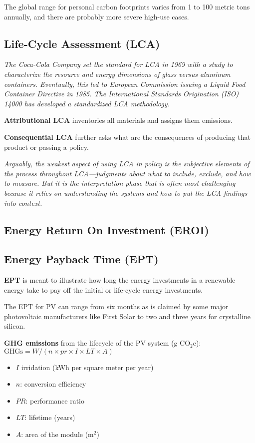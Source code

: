 The global range for personal carbon footprints varies from 1 to 100 metric
tons annually, and there are probably more severe high-use cases.

\subsection{Life-Cycle Assessment (LCA)}

\textit{
The Coca-Cola Company
set the standard for LCA in 1969 with a study to characterize the resource and
energy dimensions of glass versus aluminum containers. Eventually, this led to
European Commission issuing a Liquid Food Container Directive in 1985. The
International Standards Origination (ISO) 14000 has developed a standardized
LCA methodology.
}

\textbf{Attributional LCA} inventories all materials and assigns them
emissions.

\textbf{Consequential LCA} further asks what are the consequences of producing
that product or passing a policy.

\textit{
Arguably, the weakest aspect of using LCA in policy is the subjective elements
of the process throughout LCA—judgments about what to include, exclude, and
how to measure. But it is the interpretation phase that is often most
challenging because it relies on understanding the systems and how to put the
LCA findings into context.
}

\subsection{Energy Return On Investment (EROI)}

\subsection{Energy Payback Time (EPT)}

\textbf{EPT} is meant to illustrate how long the energy investments in a
renewable energy take to pay off the initial or life-cycle energy
investments.

The EPT for PV can range from six months as is claimed by some major
photovoltaic manufacturers like First Solar to two and three years for
crystalline silicon.

\textbf{GHG emissions} from the lifecycle of the PV system (g CO$_2$e):
$\text{GHGs} = W/(n \times pr \times I \times LT \times A)$
\begin{itemize}
	\item $I$ irridation (kWh per square meter per year)
	\item $n$: conversion efficiency
	\item $PR$: performance ratio
	\item $LT$: lifetime (years)
	\item $A$: area of the module (m$^2$)
\end{itemize}

